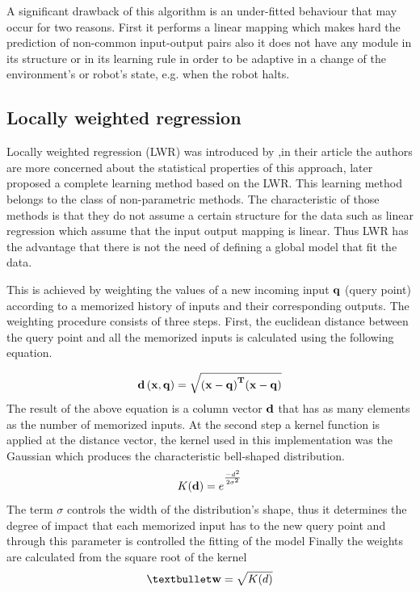 \documentclass[msc,ai,logo]{infthesis}
\begin{document}
A significant drawback of this algorithm is an under-fitted behaviour that may occur for two reasons. First it performs a linear mapping which makes hard the prediction of non-common input-output pairs also it does not have any module in its structure or in its learning rule in order to be adaptive in a change of the environment's or robot's state, e.g. when the robot halts.   

\subsection{Locally weighted regression}
Locally weighted regression (LWR) was introduced by \cite{cleveland},in their article the authors are more concerned about the statistical properties of this approach, later \cite{atkeson} proposed a complete learning method based on the LWR. This learning method belongs to the class of non-parametric methods. The characteristic of those methods is that they do not assume a certain structure for the data such as linear regression which assume that the input output mapping is linear. Thus LWR has the advantage that there is not the need of defining a global model that fit the data.

This is achieved by weighting the values of a new incoming input $\bf{q}$ (query point) according to a memorized history of inputs and their corresponding outputs. The weighting procedure consists of three steps. First, the euclidean distance between the query point and all the memorized inputs is calculated using the following equation.

\begin{equation}
\bf{d}\left( {{\bf{x}},{\bf{q}}} \right) = \sqrt {{{({\bf{x}} - {\bf{q}})}^T}({\bf{x}} - {\bf{q}})}
\end{equation}
The result of the above equation is a column vector $\bf{d}$ that has as many elements as the number of memorized inputs.  At the second step a kernel function is applied at the distance vector, the kernel used in this implementation was the Gaussian which produces the characteristic bell-shaped distribution.
\begin{equation}
 K({\bf{d}}) = {e^{ {^{\frac{{ - {d^2}}}{{2{\sigma ^2}}}}}}}
 \end{equation} 
The term $\sigma$ controls the width of the distribution's shape, thus it determines the degree of impact that each memorized input has to the new query point and through this parameter is controlled the fitting of the model 
Finally the weights are calculated from the square root of the kernel
\begin{equation}
•{\bf{w}} = \sqrt {K(d)} 
\label{eq:LWw}
\end{equation}
\end{document}
